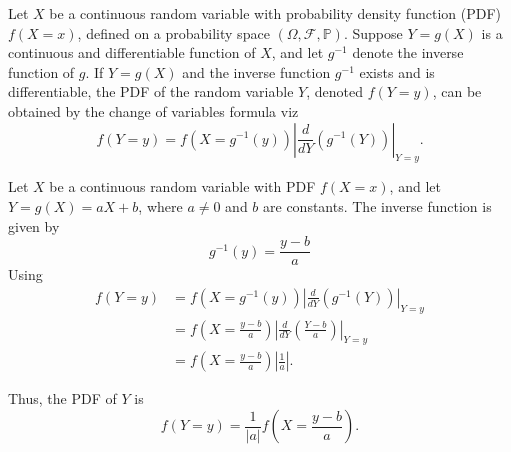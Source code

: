 \begin{definition}
	\label{def:change_of_variables}
	Let $X$ be a continuous random variable with probability density function (PDF) $f(X =x)$, defined on a probability space $(\Omega, \mathcal{F},\mathbb{P})$. Suppose $Y = g(X)$ is a continuous and differentiable function of $X$, and let $g^{-1}$ denote the inverse function of $g$. If $Y = g(X)$ and the inverse function $g^{-1}$ exists and is differentiable, the PDF of the random variable $Y$, denoted $f(Y=y)$, can be obtained by the change of variables formula viz~\cite{Sivia2006}
	\begin{equation}
		f(Y = y) = f(X = g^{-1}(y)) \left| \frac{d}{d Y} \left( g^{-1}(Y) \right) \right|_{Y=y}.
		\label{eq:change_of_variables}
	\end{equation}
\end{definition}

\begin{example}
	Let $X$ be a continuous random variable with PDF $f(X =x)$, and let $Y = g(X) = aX + b$, where $a \neq 0$ and $b$ are constants. The inverse function is given by
	\begin{equation}
		g^{-1}(y) = \frac{y - b}{a}
	\end{equation}
	Using 
	\begin{equation}
		\begin{split}
			f(Y=y) &= f\left( X = g^{-1}(y) \right) \left| \frac{d}{d Y} \left( g^{-1}(Y) \right) \right|_{Y=y} \\
			&= f\left(X =  \frac{y - b}{a} \right) \left| \frac{d}{d Y} \left( \frac{Y - b}{a} \right) \right|_{Y=y} \\
			&= f\left(X = \frac{y - b}{a} \right) \left| \frac{1}{a} \right|.
		\end{split}
	\end{equation}
	
	Thus, the PDF of $Y$ is
	\begin{equation}
		f(Y= y) = \frac{1}{|a|} f\left(X =  \frac{y - b}{a} \right).
	\end{equation}
\end{example}

